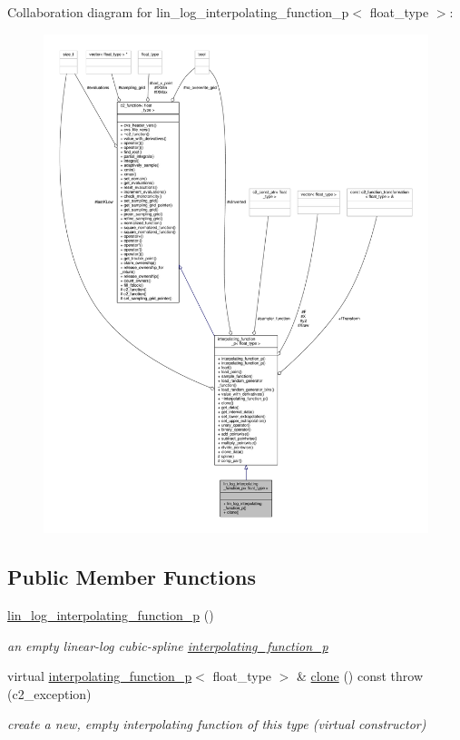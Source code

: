 Collaboration diagram for lin\+\_\+log\+\_\+interpolating\+\_\+function\+\_\+p$<$ float\+\_\+type $>$\+:
\nopagebreak
\begin{figure}[H]
\begin{center}
\leavevmode
\includegraphics[width=350pt]{classlin__log__interpolating__function__p__coll__graph}
\end{center}
\end{figure}
\subsection*{Public Member Functions}
\begin{DoxyCompactItemize}
\item 
\hyperlink{classlin__log__interpolating__function__p_a461b4f4480a10a47e315dec7ff47bb4a}{lin\+\_\+log\+\_\+interpolating\+\_\+function\+\_\+p} ()
\begin{DoxyCompactList}\small\item\em an empty linear-\/log cubic-\/spline \hyperlink{classinterpolating__function__p}{interpolating\+\_\+function\+\_\+p} \end{DoxyCompactList}\item 
virtual \hyperlink{classinterpolating__function__p}{interpolating\+\_\+function\+\_\+p}$<$ float\+\_\+type $>$ \& \hyperlink{classlin__log__interpolating__function__p_aaedeb95125e4f77a5ff00e1124ac53ab}{clone} () const   throw (c2\+\_\+exception)
\begin{DoxyCompactList}\small\item\em create a new, empty interpolating function of this type (virtual constructor) \end{DoxyCompactList}\end{DoxyCompactItemize}
